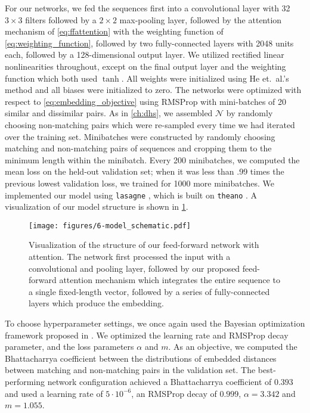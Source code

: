 For our networks, we fed the sequences first into a convolutional layer with 32 $3 \times 3$ filters followed by a $2 \times 2$ max-pooling layer, followed by the attention mechanism of \cref{eq:ffattention} with the weighting function of \cref{eq:weighting_function}, followed by two fully-connected layers with 2048 units each, followed by a 128-dimensional output layer.
We utilized rectified linear nonlinearities throughout, except on the final output layer and the weighting function which both used $\tanh$.
All weights were initialized using He et.\ al.'s method \cite{he2015delving} and all biases were initialized to zero.
The networks were optimized with respect to \cref{eq:embedding_objective} using RMSProp with mini-batches of 20 similar and dissimilar pairs.
As in \cref{ch:dhs}, we assembled $\mathcal{N}$ by randomly choosing non-matching pairs which were re-sampled every time we had iterated over the training set.
Minibatches were constructed by randomly choosing matching and non-matching pairs of sequences and cropping them to the minimum length within the minibatch.
Every 200 minibatches, we computed the mean loss on the held-out validation set; when it was less than .99 times the previous lowest validation loss, we trained for 1000 more minibatches.
We implemented our model using \texttt{lasagne} \cite{dieleman2015lasagne}, which is built on \texttt{theano} \cite{bergstra2010theano, bastien2012theano}.
A visualization of our model structure is shown in \cref{fig:model_schematic}.

\begin{figure}
  \texttt{[image: figures/6-model\_schematic.pdf]}
  \caption[Structure of our feed-forward attention network]{Visualization of the structure of our feed-forward network with attention.
The network first processed the input with a convolutional and pooling layer, followed by our proposed feed-forward attention mechanism which integrates the entire sequence to a single fixed-length vector, followed by a series of fully-connected layers which produce the embedding.}
  \label{fig:model_schematic}
\end{figure}

To choose hyperparameter settings, we once again used the Bayesian optimization framework proposed in \cite{snoek2012practical}.
We optimized the learning rate and RMSProp decay parameter, and the loss parameters $\alpha$ and $m$.
As an objective, we computed the Bhattacharrya coefficient \cite{bhattacharyya1943measure} between the distributions of embedded distances between matching and non-matching pairs in the validation set.
The best-performing network configuration achieved a Bhattacharrya coefficient of $0.393$ and used a learning rate of $5\cdot10^{-6}$, an RMSProp decay of $0.999$, $\alpha = 3.342$ and $m = 1.055$.

